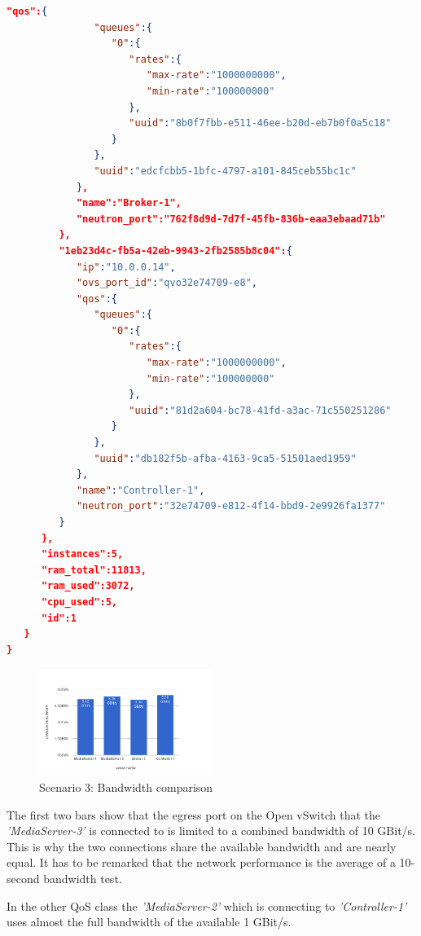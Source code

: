 \begin{lstlisting}[language=json,firstnumber=1]
            "qos":{  
               "queues":{  
                  "0":{  
                     "rates":{  
                        "max-rate":"1000000000",
                        "min-rate":"100000000"
                     },
                     "uuid":"8b0f7fbb-e511-46ee-b20d-eb7b0f0a5c18"
                  }
               },
               "uuid":"edcfcbb5-1bfc-4797-a101-845ceb55bc1c"
            },
            "name":"Broker-1",
            "neutron_port":"762f8d9d-7d7f-45fb-836b-eaa3ebaad71b"
         },
         "1eb23d4c-fb5a-42eb-9943-2fb2585b8c04":{  
            "ip":"10.0.0.14",
            "ovs_port_id":"qvo32e74709-e8",
            "qos":{  
               "queues":{  
                  "0":{  
                     "rates":{  
                        "max-rate":"1000000000",
                        "min-rate":"100000000"
                     },
                     "uuid":"81d2a604-bc78-41fd-a3ac-71c550251286"
                  }
               },
               "uuid":"db182f5b-afba-4163-9ca5-51501aed1959"
            },
            "name":"Controller-1",
            "neutron_port":"32e74709-e812-4f14-bbd9-2e9926fa1377"
         }
      },
      "instances":5,
      "ram_total":11813,
      "ram_used":3072,
      "cpu_used":5,
      "id":1
   }
}
\end{lstlisting}

\begin{figure}[H]
\centering

\includegraphics[width=0.5\textwidth]{images/evaluation/testbed_scenario2_bw}

\caption{Scenario 3: Bandwidth comparison}
\end{figure}

The first two bars show that the egress port on the Open vSwitch that the \textit{'MediaServer-3'} is connected to is limited to a combined bandwidth of 10 GBit/s. This is why the two connections share the available bandwidth and are nearly equal. It has to be remarked that the network performance is the average of a 10-second bandwidth test.

In the other QoS class the \textit{'MediaServer-2'} which is connecting to \textit{'Controller-1'} uses almost the full bandwidth of the available 1 GBit/s.

